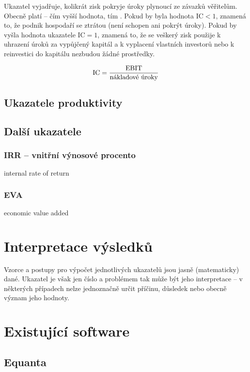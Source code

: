 Ukazatel vyjadřuje, kolikrát zisk pokryje úroky plynoucí ze závazků věřitelům. Obecně platí -- čím vyšší hodnota, tím . Pokud by byla hodnota IC$<1$, znamená to, že podnik hospodaří se ztrátou (není schopen ani pokrýt úroky). Pokud by vyšla hodnota ukazatele IC$=1$, znamená to, že se veškerý zisk použije k uhrazení úroků za vypůjčený kapitál a k vyplacení vlastních investorů nebo k reinvestici do kapitálu nezbudou žádné prostředky.

$$\text{IC} = \dfrac{\text{EBIT}}{\text{nákladové úroky}}$$







\subsection{Ukazatele produktivity}

\subsection{Další ukazatele}

\subsubsection{IRR -- vnitřní výnosové procento}
internal rate of return

\subsubsection{EVA}
economic value added



\section{Interpretace výsledků}
Vzorce a postupy pro výpočet jednotlivých ukazatelů jsou jasně (matematicky) dané. Ukazatel je však jen číslo a problémem tak může být jeho interpretace -- v některých případech nelze jednoznačně určit příčinu, důsledek nebo obecně význam jeho hodnoty. 

\section{Existující software}
\subsection{Equanta\sffamily\textregistered}

